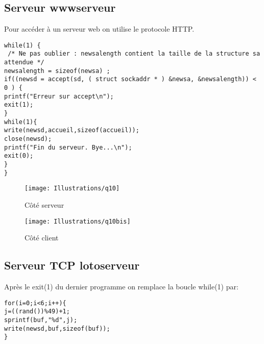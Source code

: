 \documentclass[paper=a4, fontsize=12pt]{article}
\numberwithin{equation}{section}		%
\numberwithin{figure}{section}			%
\numberwithin{table}{section}				%
\begin{document}
\subsection{Serveur wwwserveur}
Pour accéder à un serveur web on utilise le protocole HTTP.
\begin{verbatim}
while(1) {
 /* Ne pas oublier : newsalength contient la taille de la structure sa attendue */
newsalength = sizeof(newsa) ;
if((newsd = accept(sd, ( struct sockaddr * ) &newsa, &newsalength)) < 0 ) {
printf("Erreur sur accept\n");
exit(1);
}
while(1){
write(newsd,accueil,sizeof(accueil));
close(newsd);
printf("Fin du serveur. Bye...\n");
exit(0);
}	
}
\end{verbatim}
\begin{figure}[h!]
\centerline{\texttt{[image: Illustrations/q10]}}
\caption{\label{Illustrations/q10} Côté serveur}
\end{figure}
\begin{figure}[h!]
\centerline{\texttt{[image: Illustrations/q10bis]}}
\caption{\label{Illustrations/q10bis} Côté client}
\end{figure}
\subsection{Serveur TCP lotoserveur}
Après le exit(1) du dernier programme on remplace la boucle while(1) par:
\begin{verbatim}
for(i=0;i<6;i++){
j=((rand())%49)+1;
sprintf(buf,"%d",j);
write(newsd,buf,sizeof(buf));
}
\end{verbatim}
\end{document}

